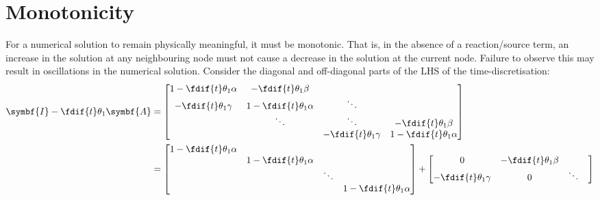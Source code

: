 \documentclass{article}
\begin{document}
\section{Monotonicity}
For a numerical solution to remain physically meaningful, it must be
monotonic. That is, in the absence of a reaction/source term, an
increase in the solution at any neighbouring node must not cause a
decrease in the solution at the current node. Failure to observe this
may result in oscillations in the numerical solution. Consider the
diagonal and off-diagonal parts of the LHS of the time-discretisation:
\begin{align*}
    \symbf{I} - \fdif{t} \theta_1 \symbf{A} & =
    \begin{bmatrix}
        1 - \fdif{t} \theta_1 \alpha & -\fdif{t} \theta_1 \beta     &                           &                              \\
        -\fdif{t} \theta_1 \gamma    & 1 - \fdif{t} \theta_1 \alpha & \ddots                    &                              \\
                                     & \ddots                       & \ddots                    & -\fdif{t} \theta_1 \beta     \\
                                     &                              & -\fdif{t} \theta_1 \gamma & 1 - \fdif{t} \theta_1 \alpha
    \end{bmatrix}
    \\
                                            & =
    \begin{bmatrix}
        1 - \fdif{t} \theta_1 \alpha &                              &        &                              \\
                                     & 1 - \fdif{t} \theta_1 \alpha &        &                              \\
                                     &                              & \ddots &                              \\
                                     &                              &        & 1 - \fdif{t} \theta_1 \alpha
    \end{bmatrix}
    +
    \begin{bmatrix}
        0                         & -\fdif{t} \theta_1 \beta &                           &                          \\
        -\fdif{t} \theta_1 \gamma & 0                        & \ddots                    &                          \\

\end{bmatrix}
\end{align*}
\end{document}
